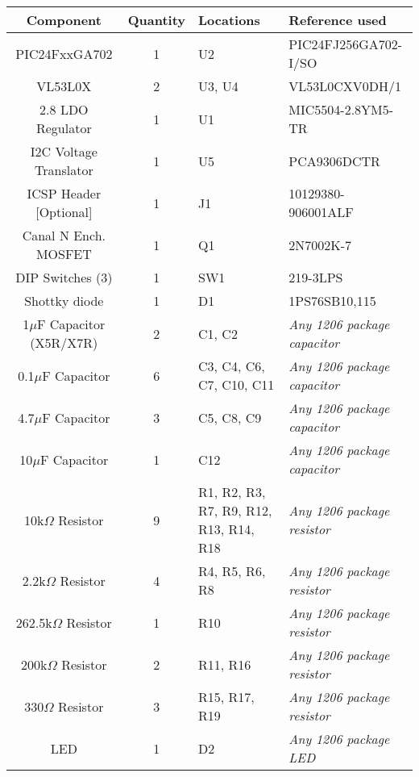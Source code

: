 \begin{tabularx}{\textwidth}{|c|c|X|X|}
\hline 
Component & Quantity & Locations & Reference used \\ 
\hline 
PIC24FxxGA702 & 1 & U2 & PIC24FJ256GA702-I/SO \\ 
\hline 
VL53L0X & 2 & U3, U4 & VL53L0CXV0DH/1 \\ 
\hline 
2.8 LDO Regulator & 1 & U1 & MIC5504-2.8YM5-TR \\ 
\hline 
I2C Voltage Translator & 1 & U5 & PCA9306DCTR \\ 
\hline 
ICSP Header [Optional] & 1 & J1 & 10129380-906001ALF \\ 
\hline 
Canal N Ench. MOSFET & 1 & Q1 & 2N7002K-7 \\ 
\hline 
DIP Switches (3) & 1 & SW1 & 219-3LPS \\ 
\hline 
Shottky diode & 1 & D1 & 1PS76SB10,115 \\ 
\hline 
1$\mu$F Capacitor (X5R/X7R) & 2 & C1, C2 & \textit{Any 1206 package capacitor}\\ 
\hline 
0.1$\mu$F Capacitor & 6 & C3, C4, C6, C7, C10, C11 & \textit{Any 1206 package capacitor}\\ 
\hline 
4.7$\mu$F Capacitor & 3 & C5, C8, C9 & \textit{Any 1206 package capacitor}\\ 
\hline 
10$\mu$F Capacitor & 1 & C12 & \textit{Any 1206 package capacitor}\\ 
\hline 
10k$\Omega$ Resistor & 9 & R1, R2, R3, R7, R9, R12, R13, R14, R18 & \textit{Any 1206 package resistor}\\ 
\hline 
2.2k$\Omega$ Resistor & 4 & R4, R5, R6, R8 & \textit{Any 1206 package resistor}\\ 
\hline 
262.5k$\Omega$ Resistor & 1 & R10 & \textit{Any 1206 package resistor}\\ 
\hline 
200k$\Omega$ Resistor & 2 & R11, R16 & \textit{Any 1206 package resistor}\\ 
\hline 
330$\Omega$ Resistor & 3 & R15, R17, R19 & \textit{Any 1206 package resistor}\\ 
\hline 
LED & 1 & D2 & \textit{Any 1206 package LED}\\ 
\hline 
\end{tabularx} 